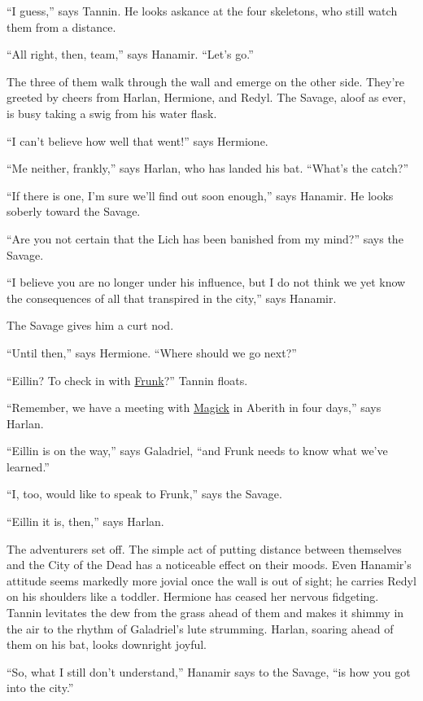 \documentclass[smalldemyvopaper,11pt,twoside,onecolumn,openright,extrafontsizes]{memoir}
\begin{document}
``I guess,'' says Tannin. He looks askance at the four skeletons, who
still watch them from a distance.

``All right, then, team,'' says Hanamir. ``Let's go.''

The three of them walk through the wall and emerge on the other side.
They're greeted by cheers from Harlan, Hermione, and Redyl. The Savage,
aloof as ever, is busy taking a swig from his water flask.

``I can't believe how well that went!'' says Hermione.

``Me neither, frankly,'' says Harlan, who has landed his bat. ``What's
the catch?''

``If there is one, I'm sure we'll find out soon enough,'' says Hanamir.
He looks soberly toward the Savage.

``Are you not certain that the Lich has been banished from my mind?''
says the Savage.

``I believe you are no longer under his influence, but I do not think we
yet know the consequences of all that transpired in the city,'' says
Hanamir.

The Savage gives him a curt nod.

``Until then,'' says Hermione. ``Where should we go next?''

``Eillin? To check in with \href{/characters/frunk/}{Frunk}?'' Tannin
floats.

``Remember, we have a meeting with \href{/characters/magick/}{Magick} in
Aberith in four days,'' says Harlan.

``Eillin is on the way,'' says Galadriel, ``and Frunk needs to know what
we've learned.''

``I, too, would like to speak to Frunk,'' says the Savage.

``Eillin it is, then,'' says Harlan.

The adventurers set off. The simple act of putting distance between
themselves and the City of the Dead has a noticeable effect on their
moods. Even Hanamir's attitude seems markedly more jovial once the wall
is out of sight; he carries Redyl on his shoulders like a toddler.
Hermione has ceased her nervous fidgeting. Tannin levitates the dew from
the grass ahead of them and makes it shimmy in the air to the rhythm of
Galadriel's lute strumming. Harlan, soaring ahead of them on his bat,
looks downright joyful.

``So, what I still don't understand,'' Hanamir says to the Savage, ``is
how you got into the city.''
\end{document}
